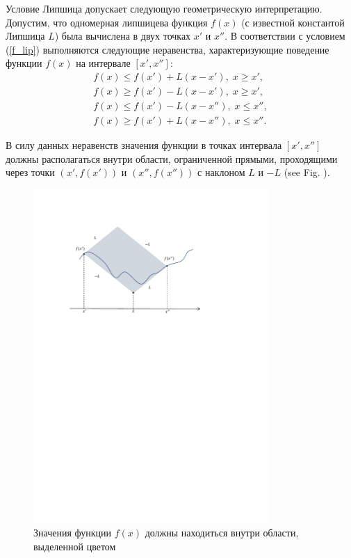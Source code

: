\documentclass[preprint,12pt]{elsarticle}
\begin{document}
Условие Липшица допускает следующую геометрическую интерпретацию. Допустим, что одномерная липшицева функция $f(x)$ (с известной константой Липшица $L$) была вычислена в двух точках $x'$ и $x''$. В соответствии с условием (\ref{f_lip}) выполняются следующие неравенства, характеризующие поведение функции $f(x)$ на интервале $[x', x'']$:
\begin{gather*}
	f(x) \leq f(x') + L(x-x'), \; x \geq x',\\
	f(x) \geq f(x') - L(x-x'), \; x \geq x',\\
	f(x) \leq f(x') - L(x-x''), \; x \leq x'',\\
	f(x) \geq f(x') + L(x-x''), \; x \leq x''.
\end{gather*}

В силу данных неравенств значения функции в точках интервала $[x', x'']$ должны располагаться внутри области, ограниченной прямыми, проходящими через точки $(x', f(x'))$ и $(x'', f(x''))$ с наклоном $L$ и $-L$ (see Fig. ).

\begin{figure}
\centering
\includegraphics[width=0.8\textwidth]{Fig1.pdf}
\caption{Значения функции $f(x)$ должны находиться внутри области, выделенной цветом} \label{fig1}
\end{figure}
\end{document}

